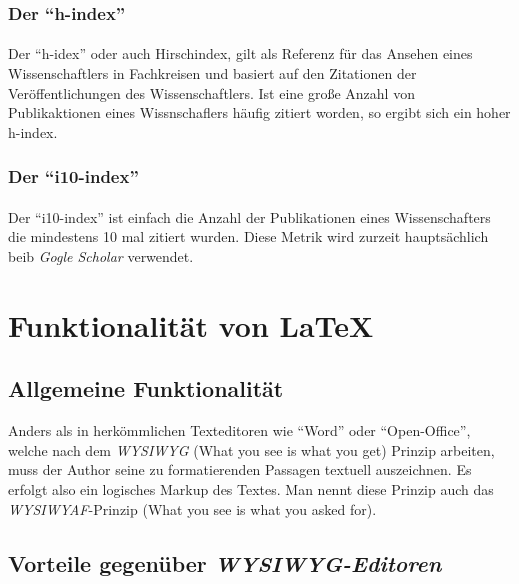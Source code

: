 \documentclass[10pt, a4paper]{article}
\begin{document}
\subsubsection{Der \enquote{h-index}}
\paragraph{}
Der \enquote{h-idex} oder auch Hirschindex, gilt als Referenz für das Ansehen eines Wissenschaftlers in Fachkreisen und basiert auf den Zitationen der Veröffentlichungen des Wissenschaftlers. Ist eine große Anzahl von Publikaktionen eines Wissnschaflers häufig zitiert worden, so ergibt sich ein hoher h-index.\par

\subsubsection{Der \enquote{i10-index}}
\paragraph{}
Der \enquote{i10-index} ist einfach die Anzahl der Publikationen eines Wissenschafters die mindestens 10 mal zitiert wurden. Diese Metrik wird zurzeit hauptsächlich beib \textit{Gogle Scholar} verwendet.

\section{Funktionalität von \LaTeX}
\subsection{Allgemeine Funktionalität}
Anders als in herkömmlichen Texteditoren wie \enquote{Word} oder \enquote{Open-Office}, welche nach dem \textit{WYSIWYG} (What you see is what you get) Prinzip arbeiten, muss der Author seine zu formatierenden Passagen textuell auszeichnen. Es erfolgt also ein logisches Markup des Textes. Man nennt diese Prinzip auch das \textit{WYSIWYAF}-Prinzip (What you see is what you asked for).\par
\subsection{Vorteile gegenüber \textit{WYSIWYG-Editoren}}
\end{document}
